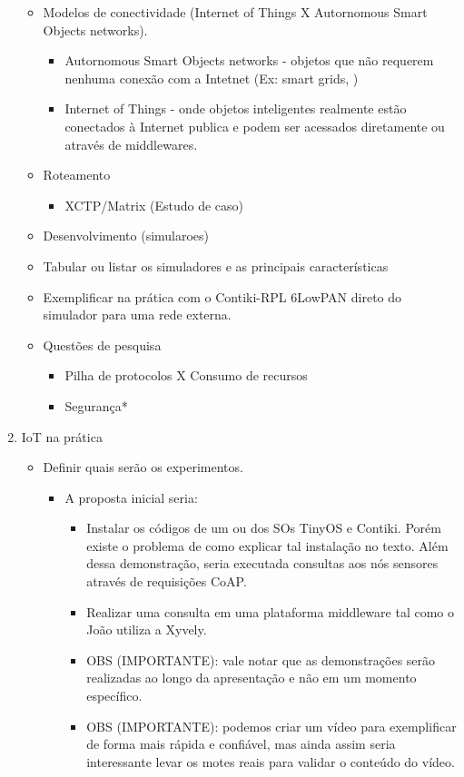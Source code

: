 \documentclass{SBCbookchapter}
\begin{document}
\begin{enumerate}
\begin{itemize}
      \item Modelos de conectividade (Internet of Things X Autornomous Smart 
Objects networks).
      \begin{itemize}
	\item Autornomous Smart Objects networks - objetos que não requerem 
nenhuma conexão com a Intetnet (Ex: smart grids, )
	\item Internet of Things - onde objetos inteligentes realmente estão 
conectados à Internet publica e podem ser acessados diretamente ou através de 
middlewares.
      \end{itemize}

      \item Roteamento
	\begin{itemize}
	 \item XCTP/Matrix (Estudo de caso)
	\end{itemize}

      \item Desenvolvimento (simularoes)
	\item Tabular ou listar os simuladores e as principais características
	\item Exemplificar na prática com o Contiki-RPL 6LowPAN direto do 
simulador para uma rede externa.

      \item Questões de pesquisa
	\begin{itemize}
	  \item Pilha de protocolos X Consumo de recursos
	  \item Segurança*
	\end{itemize}

    \end{itemize}


  \item IoT na prática
  \begin{itemize}
    \item Definir quais serão os experimentos.
    \begin{itemize}
      \item A proposta inicial seria:
      \begin{itemize}
	\item Instalar os códigos de um ou dos SOs TinyOS e Contiki. Porém 
existe o problema de como explicar tal instalação no texto. Além dessa 
demonstração, seria executada consultas aos nós sensores através de requisições 
CoAP.
	\item Realizar uma consulta em uma plataforma middleware tal como o 
João utiliza a Xyvely.
	\item OBS (IMPORTANTE): vale notar que as demonstrações serão 
realizadas ao longo da apresentação e não em um momento específico.
	\item OBS (IMPORTANTE): podemos criar um vídeo para exemplificar de 
forma mais rápida e confiável, mas ainda assim seria interessante levar os 
motes reais para validar o conteúdo do vídeo.
      \end{itemize}
    \end{itemize}


\end{itemize}
\end{enumerate}
\end{document}
